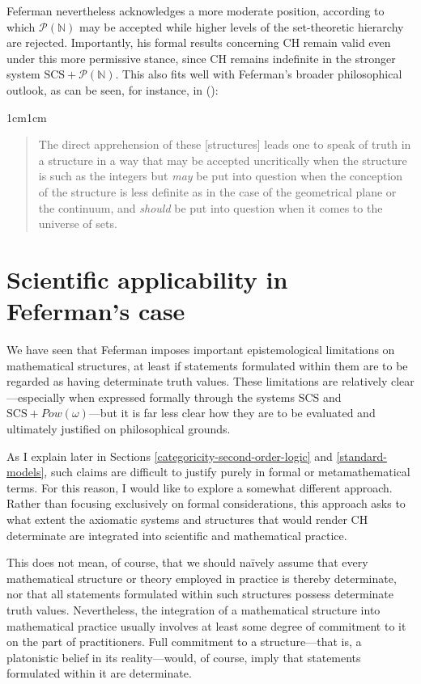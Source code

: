 \documentclass[11pt,a4paper]{book}
\theoremstyle{plain}
\begin{document}
Feferman nevertheless acknowledges a more moderate position, according to which $\mathcal{P}(\mathbb{N})$ may be accepted while higher levels of the set-theoretic hierarchy are rejected. Importantly, his formal results concerning CH remain valid even under this more permissive stance, since CH remains indefinite in the stronger system $\mathrm{SCS} + \mathcal{P}(\mathbb{N})$. This also fits well with Feferman's broader philosophical outlook, as can be seen, for instance, in (\citeyear[p.~22]{Feferman2014ConceptualStruc}):

\begin{adjustwidth}{1cm}{1cm}
\begin{quote}
\small
The direct apprehension of these [structures] leads one to speak of truth in a structure in a way that may be accepted uncritically when the structure is such as the integers but \textit{may} be put into question when the conception of the structure is less definite as in the case of the geometrical plane or the continuum, and \textit{should} be put into question when it comes to the universe of sets.
\end{quote}
\end{adjustwidth}


\section{Scientific applicability in Feferman's case}
\label{science-applicability}

We have seen that Feferman imposes important epistemological limitations on mathematical structures, at least if statements formulated within them are to be regarded as having determinate truth values. These limitations are relatively clear—especially when expressed formally through the systems $\mathrm{SCS}$ and $\mathrm{SCS} + Pow(\omega)$—but it is far less clear how they are to be evaluated and ultimately justified on philosophical grounds.

As I explain later in Sections \ref{categoricity-second-order-logic} and \ref{standard-models}, such claims are difficult to justify purely in formal or metamathematical terms. For this reason, I would like to explore a somewhat different approach. Rather than focusing exclusively on formal considerations, this approach asks to what extent the axiomatic systems and structures that would render CH determinate are integrated into scientific and mathematical practice.

This does not mean, of course, that we should naïvely assume that every mathematical structure or theory employed in practice is thereby determinate, nor that all statements formulated within such structures possess determinate truth values. Nevertheless, the integration of a mathematical structure into mathematical practice usually involves at least some degree of commitment to it on the part of practitioners. Full commitment to a structure—that is, a platonistic belief in its reality—would, of course, imply that statements formulated within it are determinate.
\end{document}
